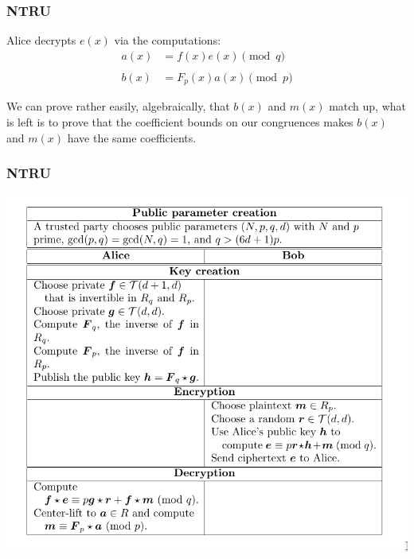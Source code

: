 \documentclass{beamer}
\begin{document}
\begin{frame}
\frametitle{NTRU}

Alice decrypts $e(x)$ via the computations:
\begin{align*}
a(x) &= f(x)e(x)\pmod q \\
& \\
b(x) &= F_p(x)a(x)\pmod p
\end{align*}

We can prove rather easily, algebraically, that $b(x)$ and $m(x)$ match up, what is left is to prove that the coefficient bounds on our congruences makes $b(x)$ and $m(x)$ have the same coefficients.
	
\end{frame}

\begin{frame}
\frametitle{NTRU}

\begin{center}
\includegraphics[scale=0.3]{Ntru-algo.png}
\end{center}

\end{frame}
\end{document}
